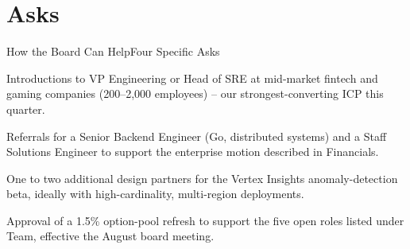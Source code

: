 \section{Asks}

\begin{frame}{How the Board Can Help}{Four Specific Asks}

  \begin{minipage}{0.48\textwidth}
    \begin{panelbox}[title={\textcolor{accent}{\faUsers}\ \ Warm Intros}]
      \scriptsize
      Introductions to VP Engineering or Head of SRE at mid-market fintech and gaming
      companies (200--2{,}000 employees) -- our strongest-converting ICP this quarter.
    \end{panelbox}
  \end{minipage}\hfill
  \begin{minipage}{0.48\textwidth}
    \begin{panelbox}[title={\textcolor{accent}{\faSearch}\ \ Hiring}]
      \scriptsize
      Referrals for a Senior Backend Engineer (Go, distributed systems) and a Staff Solutions
      Engineer to support the enterprise motion described in Financials.
    \end{panelbox}
  \end{minipage}
  \par

  \vspace{0.15cm}

  \begin{minipage}{0.48\textwidth}
    \begin{panelbox}[title={\textcolor{accent}{\faHandshake}\ \ Design Partners}]
      \scriptsize
      One to two additional design partners for the Vertex Insights anomaly-detection beta,
      ideally with high-cardinality, multi-region deployments.
    \end{panelbox}
  \end{minipage}\hfill
  \begin{minipage}{0.48\textwidth}
    \begin{panelbox}[title={\textcolor{accent}{\faFile}\ \ Board Approval}]
      \scriptsize
      Approval of a 1.5\% option-pool refresh to support the five open roles listed under
      Team, effective the August board meeting.
    \end{panelbox}
  \end{minipage}
  \par

\end{frame}

